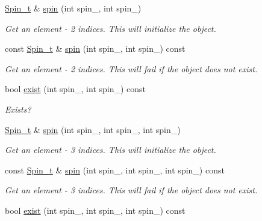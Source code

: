 \begin{DoxyCompactItemize}
\mbox{\hyperlink{structHadron_1_1HadronDistOperatorRep__t_1_1Spin__t}{Spin\+\_\+t}} \& \mbox{\hyperlink{classHadron_1_1HadronDistOperatorRep__t_acac868a7abd1608ad40c67679bec5edb}{spin}} (int spin\+\_, int spin\+\_)
\begin{DoxyCompactList}\small\item\em Get an element -\/ 2 indices. This will initialize the object. \end{DoxyCompactList}\item 
const \mbox{\hyperlink{structHadron_1_1HadronDistOperatorRep__t_1_1Spin__t}{Spin\+\_\+t}} \& \mbox{\hyperlink{classHadron_1_1HadronDistOperatorRep__t_afdd74c5a5f53f24a68bb544e4f8027f0}{spin}} (int spin\+\_, int spin\+\_) const
\begin{DoxyCompactList}\small\item\em Get an element -\/ 2 indices. This will fail if the object does not exist. \end{DoxyCompactList}\item 
bool \mbox{\hyperlink{classHadron_1_1HadronDistOperatorRep__t_a4c133a0da748a0504683cfa5e711eeb6}{exist}} (int spin\+\_, int spin\+\_) const
\begin{DoxyCompactList}\small\item\em Exists? \end{DoxyCompactList}\item 
\mbox{\hyperlink{structHadron_1_1HadronDistOperatorRep__t_1_1Spin__t}{Spin\+\_\+t}} \& \mbox{\hyperlink{classHadron_1_1HadronDistOperatorRep__t_a16cb713c1d0591585af379b01467696c}{spin}} (int spin\+\_, int spin\+\_, int spin\+\_)
\begin{DoxyCompactList}\small\item\em Get an element -\/ 3 indices. This will initialize the object. \end{DoxyCompactList}\item 
const \mbox{\hyperlink{structHadron_1_1HadronDistOperatorRep__t_1_1Spin__t}{Spin\+\_\+t}} \& \mbox{\hyperlink{classHadron_1_1HadronDistOperatorRep__t_a7d3cfc81ccf8666a8e8bb0b5cb7e919e}{spin}} (int spin\+\_, int spin\+\_, int spin\+\_) const
\begin{DoxyCompactList}\small\item\em Get an element -\/ 3 indices. This will fail if the object does not exist. \end{DoxyCompactList}\item 
bool \mbox{\hyperlink{classHadron_1_1HadronDistOperatorRep__t_a1ae795fcc4b7bc12cadef8f26884cee3}{exist}} (int spin\+\_, int spin\+\_, int spin\+\_) const

\end{DoxyCompactItemize}
